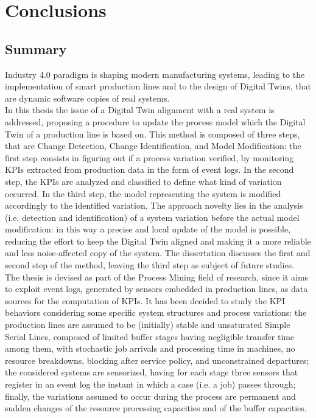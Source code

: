 \chapter{Conclusions}
\label{chapter 8}

\ifpdf
    \graphicspath{{Chapter8/Figs/}{Chapter8/Figs/PDF/}{Chapter8/Figs/}}
\else
    \graphicspath{{Chapter8/Figs/Vector/}{Chapter8/Figs/}}
\fi
\section{Summary}
Industry 4.0 paradigm is shaping modern manufacturing systems, leading to the implementation of smart production lines and to the design of Digital Twins, that are dynamic software copies of real systems.\\
In this thesis the issue of a Digital Twin alignment with a real system is addressed, proposing a procedure to update the process model which the Digital Twin of a production line is based on. This method is composed of three steps, that are Change Detection, Change Identification, and Model Modification: the first step consists in figuring out if a process variation verified, by monitoring KPIs extracted from production data in the form of event logs. In the second step, the KPIs are analyzed and classified to define what kind of variation occurred. In the third step, the model representing the system is modified accordingly to the identified variation. The approach novelty lies in the analysis (i.e. detection and identification) of a system variation before the actual model modification: in this way a precise and local update of the model is possible, reducing the effort to keep the Digital Twin aligned and making it a more reliable and less noise-affected copy of the system. The dissertation discusses the first and second step of the method, leaving the third step as subject of future studies.\\
The thesis is devised as part of the Process Mining field of research, since it aims to exploit event logs, generated by sensors embedded in production lines, as data sources for the computation of KPIs. It has been decided to study the KPI behaviors considering some specific system structures and process variations: the production lines are assumed to be (initially) stable and unsaturated Simple Serial Lines, composed of limited buffer stages having negligible transfer time among them, with stochastic job arrivals and processing time in machines, no resource breakdowns, blocking after service policy, and unconstrained departures; the considered systems are sensorized, having for each stage three sensors that register in an event log the instant in which a case (i.e. a job) passes through; finally, the variations assumed to occur during the process are permanent and sudden changes of the resource processing capacities and of the buffer capacities. \\
